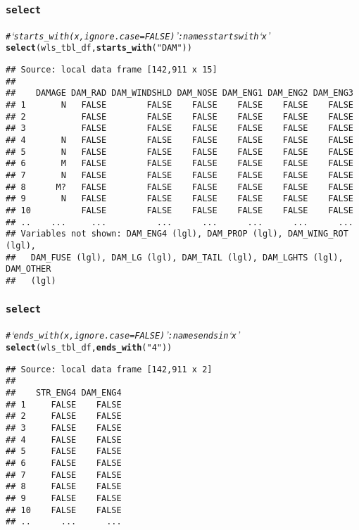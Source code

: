\documentclass{beamer}\usepackage[]{graphicx}\usepackage[]{color}
\makeatletter
\newcommand{\hlstr}[1]{\textcolor[rgb]{0.192,0.494,0.8}{#1}}%
\newcommand{\hlcom}[1]{\textcolor[rgb]{0.678,0.584,0.686}{\textit{#1}}}%
\newcommand{\hlstd}[1]{\textcolor[rgb]{0.345,0.345,0.345}{#1}}%
\newcommand{\hlkwd}[1]{\textcolor[rgb]{0.737,0.353,0.396}{\textbf{#1}}}%
\newenvironment{kframe}{%
 \def\at@end@of@kframe{}%
 \ifinner\ifhmode%
  \def\at@end@of@kframe{\end{minipage}}%
  \begin{minipage}{\columnwidth}%
 \fi\fi%
 \def\FrameCommand##1{\hskip\@totalleftmargin \hskip-\fboxsep
 \colorbox{shadecolor}{##1}\hskip-\fboxsep
     \hskip-\linewidth \hskip-\@totalleftmargin \hskip\columnwidth}%
 \MakeFramed {\advance\hsize-\width
   \@totalleftmargin\z@ \linewidth\hsize
   \@setminipage}}%
 {\par\unskip\endMakeFramed%
 \at@end@of@kframe}
\newenvironment{knitrout}{}{} %
\makeatother
\begin{document}
\begin{frame}[fragile]
  \frametitle{{\tt select}}
\begin{knitrout}\footnotesize
{}\color{fgcolor}\begin{kframe}
\begin{alltt}
\hlcom{# ‘starts_with(x, ignore.case = FALSE)’: names starts with ‘x’}
\hlkwd{select}\hlstd{(wls_tbl_df,} \hlkwd{starts_with}\hlstd{(}\hlstr{"DAM"}\hlstd{))}
\end{alltt}
\begin{verbatim}
## Source: local data frame [142,911 x 15]
## 
##    DAMAGE DAM_RAD DAM_WINDSHLD DAM_NOSE DAM_ENG1 DAM_ENG2 DAM_ENG3
## 1       N   FALSE        FALSE    FALSE    FALSE    FALSE    FALSE
## 2           FALSE        FALSE    FALSE    FALSE    FALSE    FALSE
## 3           FALSE        FALSE    FALSE    FALSE    FALSE    FALSE
## 4       N   FALSE        FALSE    FALSE    FALSE    FALSE    FALSE
## 5       N   FALSE        FALSE    FALSE    FALSE    FALSE    FALSE
## 6       M   FALSE        FALSE    FALSE    FALSE    FALSE    FALSE
## 7       N   FALSE        FALSE    FALSE    FALSE    FALSE    FALSE
## 8      M?   FALSE        FALSE    FALSE    FALSE    FALSE    FALSE
## 9       N   FALSE        FALSE    FALSE    FALSE    FALSE    FALSE
## 10          FALSE        FALSE    FALSE    FALSE    FALSE    FALSE
## ..    ...     ...          ...      ...      ...      ...      ...
## Variables not shown: DAM_ENG4 (lgl), DAM_PROP (lgl), DAM_WING_ROT (lgl),
##   DAM_FUSE (lgl), DAM_LG (lgl), DAM_TAIL (lgl), DAM_LGHTS (lgl), DAM_OTHER
##   (lgl)
\end{verbatim}
\end{kframe}
\end{knitrout}
\end{frame} 

\begin{frame}[fragile]
  \frametitle{{\tt select}}
\begin{knitrout}\footnotesize
{}\color{fgcolor}\begin{kframe}
\begin{alltt}
\hlcom{# ‘ends_with(x, ignore.case = FALSE)’: names ends in ‘x’}
\hlkwd{select}\hlstd{(wls_tbl_df,} \hlkwd{ends_with}\hlstd{(}\hlstr{"4"}\hlstd{))}
\end{alltt}
\begin{verbatim}
## Source: local data frame [142,911 x 2]
## 
##    STR_ENG4 DAM_ENG4
## 1     FALSE    FALSE
## 2     FALSE    FALSE
## 3     FALSE    FALSE
## 4     FALSE    FALSE
## 5     FALSE    FALSE
## 6     FALSE    FALSE
## 7     FALSE    FALSE
## 8     FALSE    FALSE
## 9     FALSE    FALSE
## 10    FALSE    FALSE
## ..      ...      ...
\end{verbatim}
\end{kframe}
\end{knitrout}
\end{frame} 
\end{document}
